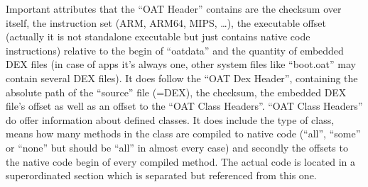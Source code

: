 Important attributes that the ``OAT Header'' contains are the
checksum over itself,
the instruction set (ARM, ARM64, MIPS, \ldots), the executable
offset (actually it is not standalone executable but just contains
native code instructions)
relative to the begin of ``oatdata'' and the quantity of embedded
DEX files (in case of apps it's always one, other system files like
``boot.oat'' may contain several DEX files). It does follow the
``OAT Dex Header'', containing
the absolute path of the ``source'' file (=DEX), the checksum, the
embedded DEX file's offset as well as
an offset to the ``OAT Class Headers''. ``OAT Class Headers''
do offer information about defined classes. It does include the type
of class, means how many methods in the class
are compiled to native code (``all'', ``some'' or ``none'' but
should be ``all'' in almost every case) and secondly
the offsets to the native code begin of every compiled method.
The actual code is located in a superordinated section
 which is separated but referenced from this one.

